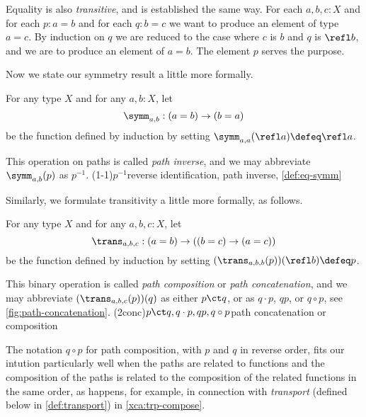 Equality is also \emph{transitive}, and is established the same way.
For each $a,b,c:X$ and for each $p:a=b$ and for each $q:b=c$ we want to produce an
element of type $a=c$.  By induction on $q$ we are reduced to the case where $c$ is $b$ and $q$ is $\refl b$, and we are to produce an element
of $a=b$.  The element $p$ serves the purpose.

Now we state our symmetry result a little more formally.

\begin{definition}\label{def:eq-symm}
  For any type $X$ and for any $a,b:X$, let $$\symm_{a,b} : (a=b) \to (b=a)$$
  be the function defined by induction by setting
  $\symm_{a,a}(\refl a) \defeq \refl a$.

  This operation on paths is called \emph{path inverse}, and we may abbreviate $\symm_{a,b}(p)$ as $p^{-1}$.
  \glossary(1-1){$p^{-1}$}{reverse identification, path inverse, \cref{def:eq-symm}}
\end{definition}

Similarly, we formulate transitivity a little more formally, as follows.

\begin{definition}\label{def:eq-trans}
  For any type $X$ and for any $a,b,c:X$, let $$\trans_{a,b,c} : (a=b) \to ((b=c) \to (a=c))$$ be the function defined by induction by setting
  $(\trans_{a,b,b} (p)) (\refl b ) \defeq p$.

  This binary operation is called \emph{path composition} or \emph{path concatenation},
  and we may abbreviate $(\trans_{a,b,c}(p))(q)$ as either $p \ct q$, or as $q \cdot p$, $qp$, or $q \circ p$, see \cref{fig:path-concatenation}.  
  \glossary(2conc){$p\protect\ct q, q\cdot p, qp, q\circ p$}{path concatenation or composition}
\end{definition}

The notation $q\circ p$ for path composition, with $p$ and $q$ in reverse order,
fits our intution particularly well when the paths are related to functions and the composition of
the paths is related to the composition of the related functions in the same order, as happens, for example, in connection with {\em transport}
(defined below in \cref{def:transport}) in \cref{xca:trp-compose}.

